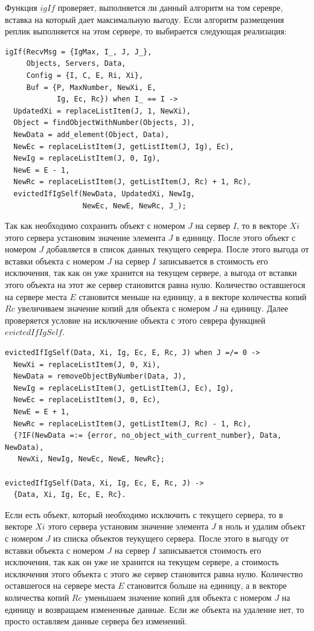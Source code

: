 			Функция $igIf$ проверяет, выполняется ли данный алгоритм на том серевре, вставка на который дает максимальную выгоду. Если алгоритм размещения реплик выполняется на этом сервере, то
			выбирается следующая реализация:
			\begin{lstlisting}
igIf(RecvMsg = {IgMax, I_, J, J_}, 
     Objects, Servers, Data,
     Config = {I, C, E, Ri, Xi},
     Buf = {P, MaxNumber, NewXi, E, 
            Ig, Ec, Rc}) when I_ == I ->
  UpdatedXi = replaceListItem(J, 1, NewXi),
  Object = findObjectWithNumber(Objects, J),
  NewData = add_element(Object, Data),    
  NewEc = replaceListItem(J, getListItem(J, Ig), Ec),
  NewIg = replaceListItem(J, 0, Ig),
  NewE = E - 1,
  NewRc = replaceListItem(J, getListItem(J, Rc) + 1, Rc),
  evictedIfIgSelf(NewData, UpdatedXi, NewIg,
                  NewEc, NewE, NewRc, J_);
			\end{lstlisting}
			Так как необходимо сохранить объект с номером $J$ на сервер $I$, то в векторе $Xi$ этого сервера установим значение элемента $J$ в единицу. После этого объект с номером $J$ добавляется 
			в список данных текущего севрера. После этого выгода от вставки объекта с номером $J$ на сервер $I$ записывается в стоимость его исключения, так как он уже хранится на текущем сервере,
			а выгода от вставки этого объекта на этот же сервер становится равна нулю. Количество оставшегося на сервере места $E$ становится меньше на единицу, а в векторе количества копий $Rc$
			увеличиваем значение копий для объекта с номером $J$ на единицу. Далее проверяется условие на исключение объекта с этого севрера функцией $evictedIfIgSelf$.
			\begin{lstlisting}
evictedIfIgSelf(Data, Xi, Ig, Ec, E, Rc, J) when J =/= 0 ->
  NewXi = replaceListItem(J, 0, Xi),
  NewData = removeObjectByNumber(Data, J),
  NewIg = replaceListItem(J, getListItem(J, Ec), Ig),
  NewEc = replaceListItem(J, 0, Ec),
  NewE = E + 1,
  NewRc = replaceListItem(J, getListItem(J, Rc) - 1, Rc),
  {?IF(NewData =:= {error, no_object_with_current_number}, Data, NewData), 
   NewXi, NewIg, NewEc, NewE, NewRc};
	
evictedIfIgSelf(Data, Xi, Ig, Ec, E, Rc, J) -> 
  {Data, Xi, Ig, Ec, E, Rc}.				
			\end{lstlisting}
			Если есть объект, который необходимо исключить с текущего сервера, то в векторе $Xi$ этого сервера установим значение элемента $J$ в ноль и удалим объект с номером $J$ из списка 
			объектов теукущего сервера. После этого в выгоду от вставки объекта с номером $J$ на сервер $I$ записывается стоимость его исключения, так как он уже не хранится на текущем сервере,
			а стоимость исключения этого объекта с этого же сервер становится равна нулю. Количество оставшегося на сервере места $E$ становится больше на единицу, а в векторе количества копий 
			$Rc$ уменьшаем значение копий для объекта с номером $J$ на единицу и возвращаем измененные данные. Если же объекта на удаление нет, то просто оставляем данные сервера без изменений.

